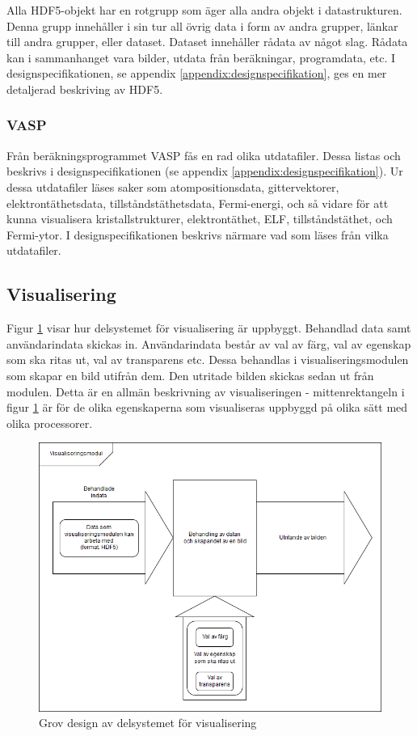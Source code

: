 \documentclass[a4paper,12pt]{article}
\begin{document}
Alla HDF5-objekt har en rotgrupp som äger alla andra objekt i datastrukturen. Denna grupp innehåller i sin tur all övrig data i form av andra grupper, länkar till andra grupper, eller dataset.
Dataset innehåller rådata av något slag. Rådata kan i sammanhanget vara bilder, utdata från beräkningar, programdata, etc. %
I designspecifikationen, se appendix \ref{appendix:designspecifikation}, ges en mer detaljerad beskriving av HDF5.

\subsubsection{VASP}
Från beräkningsprogrammet VASP fås en rad olika utdatafiler. Dessa listas och beskrivs i designspecifikationen 
(se appendix \ref{appendix:designspecifikation}). Ur dessa utdatafiler läses saker som atompositionsdata, gittervektorer, elektrontäthetsdata, tillståndstäthetsdata, Fermi-energi, och så vidare för att kunna visualisera kristallstrukturer, elektrontäthet, ELF, tillståndstäthet, och Fermi-ytor. I designspecifikationen beskrivs närmare vad som läses från vilka utdatafiler. 

\subsection{Visualisering}
\label{ch:visualisering}
Figur \ref{fig:visualisering} visar hur delsystemet för visualisering är uppbyggt. Behandlad data samt användarindata skickas in. Användarindata består av val av färg, val av egenskap som ska ritas ut, val av transparens etc. Dessa behandlas i visualiseringsmodulen som skapar en bild utifrån dem. Den utritade bilden skickas sedan ut från modulen. Detta är en allmän beskrivning av visualiseringen - mittenrektangeln i figur \ref{fig:visualisering} är för de olika egenskaperna som visualiseras uppbyggd på olika sätt med olika processorer.
\label{visualisering}
\begin{figure}[H]
	\centering
	\includegraphics[scale=0.45]{Visualisering.png}
	\caption{Grov design av delsystemet för visualisering}
	\label{fig:visualisering}
\end{figure}
\end{document}

